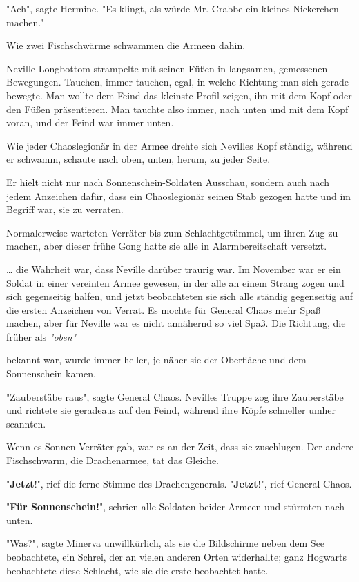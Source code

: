 {"Ach", sagte Hermine. "Es klingt, als würde Mr. Crabbe ein kleines Nickerchen machen."

Wie zwei Fischschwärme schwammen die Armeen dahin.

Neville Longbottom strampelte mit seinen Füßen in langsamen, gemessenen Bewegungen. Tauchen, immer tauchen, egal, in welche Richtung man sich gerade bewegte. Man wollte dem Feind das kleinste Profil zeigen, ihn mit dem Kopf oder den Füßen präsentieren. Man tauchte also immer, nach unten und mit dem Kopf voran, und der Feind war immer unten.

Wie jeder Chaoslegionär in der Armee drehte sich Nevilles Kopf ständig, während er schwamm, schaute nach oben, unten, herum, zu jeder Seite.

Er hielt nicht nur nach Sonnenschein-Soldaten Ausschau, sondern auch nach jedem Anzeichen dafür, dass ein Chaoslegionär seinen Stab gezogen hatte und im Begriff war, sie zu verraten.

Normalerweise warteten Verräter bis zum Schlachtgetümmel, um ihren Zug zu machen, aber dieser frühe Gong hatte sie alle in Alarmbereitschaft versetzt.

… die Wahrheit war, dass Neville darüber traurig war. Im November war er ein Soldat in einer vereinten Armee gewesen, in der alle an einem Strang zogen und sich gegenseitig halfen, und jetzt beobachteten sie sich alle ständig gegenseitig auf die ersten Anzeichen von Verrat. Es mochte für General Chaos mehr Spaß machen, aber für Neville war es nicht annähernd so viel Spaß. Die Richtung, die früher als \emph{"oben"}

bekannt war, wurde immer heller, je näher sie der Oberfläche und dem Sonnenschein kamen.

"Zauberstäbe raus", sagte General Chaos. Nevilles Truppe zog ihre Zauberstäbe und richtete sie geradeaus auf den Feind, während ihre Köpfe schneller umher scannten.

Wenn es Sonnen-Verräter gab, war es an der Zeit, dass sie zuschlugen. Der andere Fischschwarm, die Drachenarmee, tat das Gleiche.

"\textbf{Jetzt}!", rief die ferne Stimme des Drachengenerals. "\textbf{Jetzt}!", rief General Chaos.

"\textbf{Für Sonnenschein!}", schrien alle Soldaten beider Armeen und stürmten nach unten.

"Was?", sagte Minerva unwillkürlich, als sie die Bildschirme neben dem See beobachtete, ein Schrei, der an vielen anderen Orten widerhallte; ganz Hogwarts beobachtete diese Schlacht, wie sie die erste beobachtet hatte.

}
